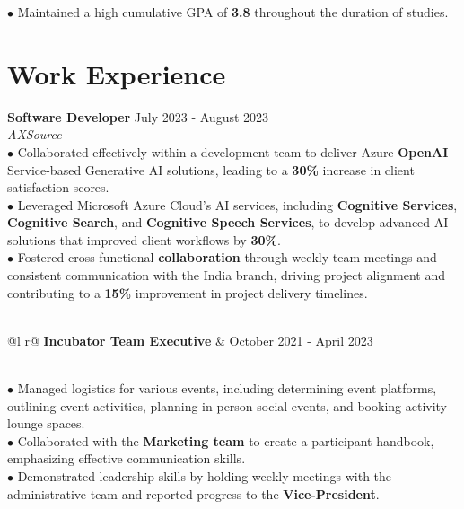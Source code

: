 \documentclass[letterpaper,12pt]{article}
\begin{document}
\hspace{0.3cm} $\bullet$ {\fontsize{10pt}{9pt}\selectfont Maintained a high cumulative GPA of \textbf{3.8} throughout the duration of studies.}

\section{Work Experience}

\textbf{Software Developer}  \hfill   July 2023 - August 2023 \\
\textit{AXSource} 
\vspace{0.3cm}  
\\\hspace{0.1cm} $\bullet$ Collaborated effectively within a development team to deliver Azure \textbf{OpenAI} Service-based Generative AI solutions, leading to a \textbf{30\%} increase in client satisfaction scores.\\
\hspace{0.1cm} $\bullet$ \hspace{0.05cm}Leveraged Microsoft Azure Cloud's AI services, including \textbf{Cognitive Services}, \textbf{Cognitive Search}, and \textbf{Cognitive Speech Services}, to develop advanced AI solutions that improved client workflows by \textbf{30\%}. \\
\hspace{0.1cm} $\bullet$ \hspace{0.05cm} Fostered cross-functional \textbf{collaboration} through weekly team meetings and consistent communication with the India branch, driving project alignment and contributing to a \textbf{15\%} improvement in project delivery timelines. \\\\
\begin{tabularx}{\linewidth}{ @{}l r@{} }
    \textbf{Incubator Team Executive} &  \hfill \normalsize{October 2021 - April 2023} \\
\end{tabularx} 
\vspace{0.25cm} \\
\hspace{0.1cm} $\bullet$ Managed logistics for various events, including determining event platforms, outlining event activities, planning in-person social events, and booking activity lounge spaces. \\ 
\hspace{0.1cm} $\bullet$ \hspace{0.05cm}Collaborated with the \textbf{Marketing team} to create a participant handbook, emphasizing effective communication skills.\\
\hspace{0.1cm} $\bullet$ \hspace{0.03cm}Demonstrated leadership skills by holding weekly meetings with the administrative team and reported progress to the \textbf{Vice-President}.
\end{document}
